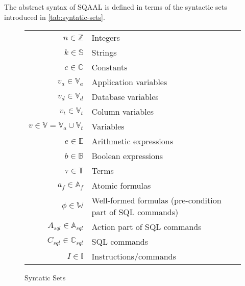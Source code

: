 The abstract syntax of SQAAL is defined in terms of the syntactic sets introduced in \autoref{tab:syntatic-sets}.
\begin{figure}[htb!]
     \center
    \begin{tabular}{r p{ }}
    $n \in \mathbb{Z}$                          & Integers                                                   \\
    $k \in \mathbb{S}$                                  & Strings                                                    \\
    $c \in \mathbb{C}$                          & Constants                                                 \\
    $v_a \in \mathbb{V}_a$                      & Application variables                                     \\
    $v_d \in \mathbb{V}_d$                      & Database variables \\
    $v_t \in \mathbb{V}_t$                    & Column variables   \\
    $v \in \mathbb{V} = \mathbb{V}_a \cup \mathbb{V}_t$ & Variables                                                 \\
    $e \in \mathbb{E}$                          & Arithmetic expressions                                    \\
    $b \in \mathbb{B}$                          & Boolean expressions                                       \\
    $\tau \in \mathbb{T}$                       & Terms                                                     \\
    $a_f \in \mathbb{A}_f$                      & Atomic formulas                                           \\
    $\phi  \in \mathbb{W}$                      & Well-formed formulas (pre-condition part of SQL commands) \\
    $A_{sql} \in \mathbb{A}_{sql}$              & Action part of SQL commands                               \\
    $C_{sql} \in \mathbb{C}_{sql}$              & SQL commands                                              \\
    $I \in \mathbb{I}$                          & Instructions/commands                                     \\
    \end{tabular}
    \caption{Syntatic Sets}
    \label{tab:syntatic-sets}
\end{figure}

